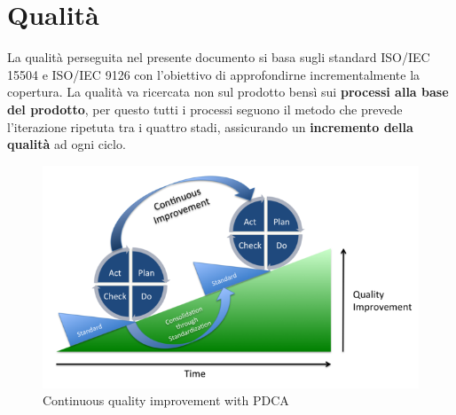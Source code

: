 \pagebreak
\section{Qualità}
\label{appendice-qualita}
La qualità perseguita nel presente documento si basa sugli standard ISO/IEC 15504  e ISO/IEC 9126 con l'obiettivo di approfondirne incrementalmente la copertura.
La qualità va ricercata non sul prodotto bensì sui \textbf{processi alla base del prodotto}, per questo tutti i processi seguono il metodo  che prevede l'iterazione ripetuta tra i quattro stadi, assicurando un \textbf{incremento della qualità} ad ogni ciclo. \\
	\begin{figure}[h]
	\centering \includegraphics[width=1\textwidth]{PDCA.png}
	\caption{Continuous quality improvement with PDCA}
	\end{figure}
	
